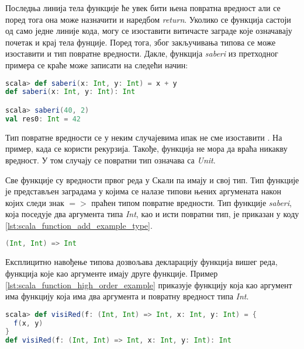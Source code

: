 \documentclass[12pt,oneside]{memoir}
\begin{document}
Последња линија тела функције ће увек бити њена повратна вредност али се поред тога она може назначити и наредбом \textit{return}. Уколико се функција састоји од само једне линије кода, могу се изоставити витичасте заграде које означавају почетак и крај тела фунције. Поред тога, због закључивања типова се може изоставити и тип повратне вредности. Дакле, функција \textit{saberi} из претходног примера се краће може записати на следећи начин:

\begin{lstlisting}[language=Scala, caption={Краћи запис функције \textit{saberi} и пример њеног позива}, label={lst:scala_function_add_example_simplified}, basicstyle=\small]
scala> def saberi(x: Int, y: Int) = x + y
def saberi(x: Int, y: Int): Int

scala> saberi(40, 2)
val res0: Int = 42
\end{lstlisting}

Тип повратне вредности се у неким случајевима ипак не сме изоставити \cite{scala_prog}. На пример, када се користи рекурзија. Такође, функција не мора да враћа никакву вредност. У том случају се повратни тип означава са \textit{Unit}.

Све функције су вредности првог реда у Скали па имају и свој тип. Тип функције је представљен заградама у којима се налазе типови њених аргумената након којих следи знак $=>$ праћен типом повратне вредности. Тип функције \textit{saberi}, која поседује два аргумента типа \textit{Int}, као и исти повратни тип, је приказан у коду \ref{lst:scala_function_add_example_type}.

\begin{lstlisting}[language=Scala, caption={Тип функције \textit{saberi}}, label={lst:scala_function_add_example_type}, basicstyle=\small]
(Int, Int) => Int
\end{lstlisting}

Експлицитно навођење типова дозвољава декларацију функција вишег реда, функција које као аргументе имају друге функције. Пример \ref{lst:scala_function_high_order_example} приказује функцију која као аргумент има функцију која има два аргумента и повратну вредност типа \textit{Int}.

\begin{lstlisting}[language=Scala, caption={Функција вишег реда}, label={lst:scala_function_high_order_example}, basicstyle=\small]
scala> def visiRed(f: (Int, Int) => Int, x: Int, y: Int) = {
  f(x, y)
}
def visiRed(f: (Int, Int) => Int, x: Int, y: Int): Int
\end{lstlisting}
\end{document}
